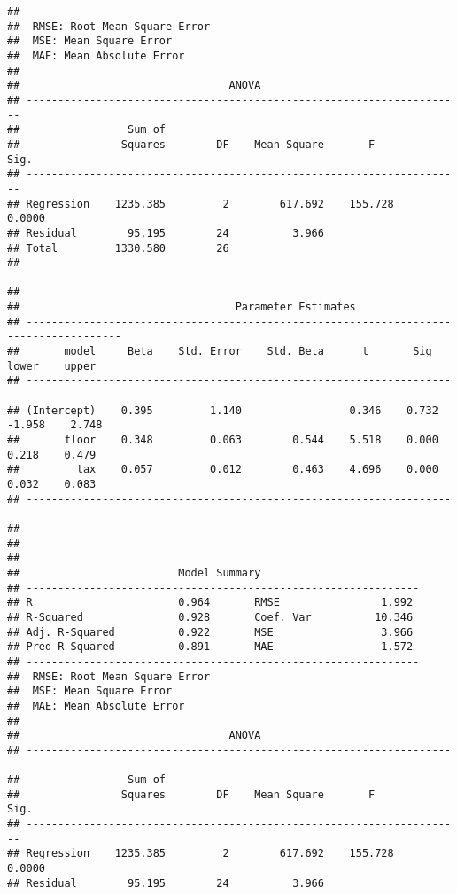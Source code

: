\documentclass[
]{book}
\begin{document}
\begin{verbatim}
## --------------------------------------------------------------
##  RMSE: Root Mean Square Error 
##  MSE: Mean Square Error 
##  MAE: Mean Absolute Error 
## 
##                                 ANOVA                                 
## ---------------------------------------------------------------------
##                 Sum of                                               
##                Squares        DF    Mean Square       F         Sig. 
## ---------------------------------------------------------------------
## Regression    1235.385         2        617.692    155.728    0.0000 
## Residual        95.195        24          3.966                      
## Total         1330.580        26                                     
## ---------------------------------------------------------------------
## 
##                                  Parameter Estimates                                  
## -------------------------------------------------------------------------------------
##       model     Beta    Std. Error    Std. Beta      t       Sig      lower    upper 
## -------------------------------------------------------------------------------------
## (Intercept)    0.395         1.140                 0.346    0.732    -1.958    2.748 
##       floor    0.348         0.063        0.544    5.518    0.000     0.218    0.479 
##         tax    0.057         0.012        0.463    4.696    0.000     0.032    0.083 
## -------------------------------------------------------------------------------------
## 
## 
## 
##                         Model Summary                          
## --------------------------------------------------------------
## R                       0.964       RMSE                1.992 
## R-Squared               0.928       Coef. Var          10.346 
## Adj. R-Squared          0.922       MSE                 3.966 
## Pred R-Squared          0.891       MAE                 1.572 
## --------------------------------------------------------------
##  RMSE: Root Mean Square Error 
##  MSE: Mean Square Error 
##  MAE: Mean Absolute Error 
## 
##                                 ANOVA                                 
## ---------------------------------------------------------------------
##                 Sum of                                               
##                Squares        DF    Mean Square       F         Sig. 
## ---------------------------------------------------------------------
## Regression    1235.385         2        617.692    155.728    0.0000 
## Residual        95.195        24          3.966                      

\end{verbatim}
\end{document}
